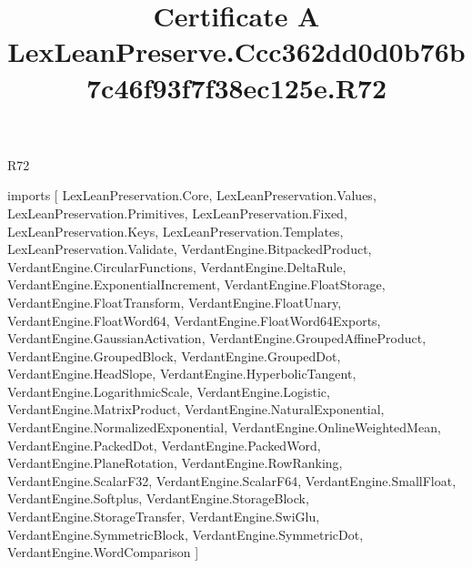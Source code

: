 \begin{lexlean}{R72}
\title{Certificate A LexLeanPreserve.Ccc362dd0d0b76b7c46f93f7f38ec125e.R72}
\begin{coremodule}
imports [
  LexLeanPreservation.Core,
  LexLeanPreservation.Values,
  LexLeanPreservation.Primitives,
  LexLeanPreservation.Fixed,
  LexLeanPreservation.Keys,
  LexLeanPreservation.Templates,
  LexLeanPreservation.Validate,
  VerdantEngine.BitpackedProduct,
  VerdantEngine.CircularFunctions,
  VerdantEngine.DeltaRule,
  VerdantEngine.ExponentialIncrement,
  VerdantEngine.FloatStorage,
  VerdantEngine.FloatTransform,
  VerdantEngine.FloatUnary,
  VerdantEngine.FloatWord64,
  VerdantEngine.FloatWord64Exports,
  VerdantEngine.GaussianActivation,
  VerdantEngine.GroupedAffineProduct,
  VerdantEngine.GroupedBlock,
  VerdantEngine.GroupedDot,
  VerdantEngine.HeadSlope,
  VerdantEngine.HyperbolicTangent,
  VerdantEngine.LogarithmicScale,
  VerdantEngine.Logistic,
  VerdantEngine.MatrixProduct,
  VerdantEngine.NaturalExponential,
  VerdantEngine.NormalizedExponential,
  VerdantEngine.OnlineWeightedMean,
  VerdantEngine.PackedDot,
  VerdantEngine.PackedWord,
  VerdantEngine.PlaneRotation,
  VerdantEngine.RowRanking,
  VerdantEngine.ScalarF32,
  VerdantEngine.ScalarF64,
  VerdantEngine.SmallFloat,
  VerdantEngine.Softplus,
  VerdantEngine.StorageBlock,
  VerdantEngine.StorageTransfer,
  VerdantEngine.SwiGlu,
  VerdantEngine.SymmetricBlock,
  VerdantEngine.SymmetricDot,
  VerdantEngine.WordComparison
]


\end{coremodule}
\end{lexlean}
